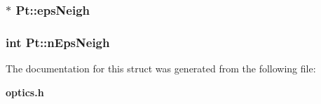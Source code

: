 \subsubsection{$\ast$ {\bf Pt::epsNeigh}}\label{structPt_9a2f33205004f2df4a92a6c20457d9a9}


\subsubsection{\setlength{\rightskip}{0pt plus 5cm}int {\bf Pt::nEpsNeigh}}\label{structPt_732902ec4e3bdfb7ca33dc89b30b54b8}




The documentation for this struct was generated from the following file:\begin{CompactItemize}
\item 
{\bf optics.h}\end{CompactItemize}
